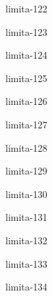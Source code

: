 \begin{defproblem}{limita-122}

\end{defproblem}

\begin{defproblem}{limita-123}

\end{defproblem}

\begin{defproblem}{limita-124}

\end{defproblem}

\begin{defproblem}{limita-125}

\end{defproblem}

\begin{defproblem}{limita-126}

\end{defproblem}

\begin{defproblem}{limita-127}

\end{defproblem}

\begin{defproblem}{limita-128}

\end{defproblem}

\begin{defproblem}{limita-129}

\end{defproblem}

\begin{defproblem}{limita-130}

\end{defproblem}

\begin{defproblem}{limita-131}

\end{defproblem}

\begin{defproblem}{limita-132}

\end{defproblem}

\begin{defproblem}{limita-133}

\end{defproblem}

\begin{defproblem}{limita-134}

\end{defproblem}

